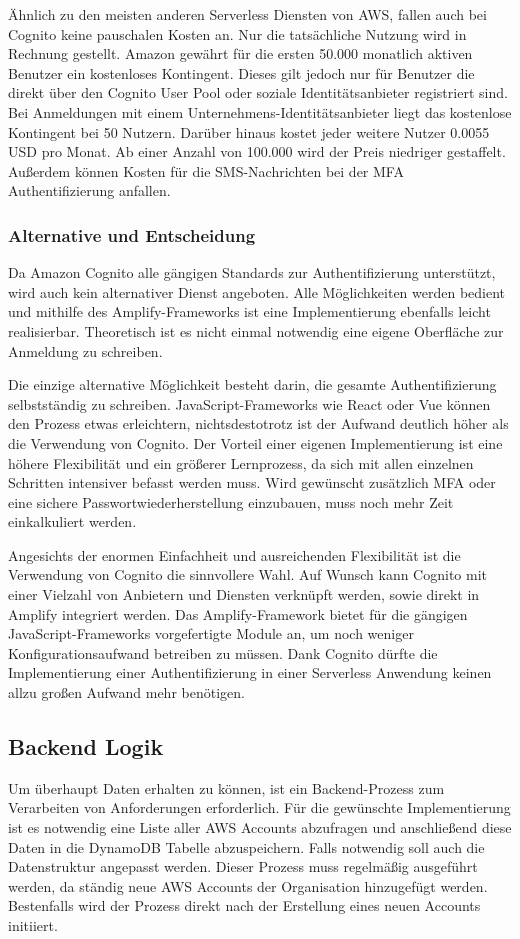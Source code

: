 {Ähnlich zu den meisten anderen Serverless Diensten von AWS, fallen auch bei Cognito keine pauschalen Kosten an.
Nur die tatsächliche Nutzung wird in Rechnung gestellt.
Amazon gewährt für die ersten 50.000 monatlich aktiven Benutzer ein kostenloses Kontingent.
Dieses gilt jedoch nur für Benutzer die direkt über den Cognito User Pool oder soziale Identitätsanbieter registriert sind.
Bei Anmeldungen mit einem Unternehmens-Identitätsanbieter liegt das kostenlose Kontingent bei 50 Nutzern.
Darüber hinaus kostet jeder weitere Nutzer 0.0055 USD pro Monat.
Ab einer Anzahl von 100.000 wird der Preis niedriger gestaffelt.
Außerdem können Kosten für die SMS-Nachrichten bei der MFA Authentifizierung anfallen.\cite{CognitoPreise}


\subsubsection{Alternative und Entscheidung}
\label{CognitoEntscheidung}
Da Amazon Cognito alle gängigen Standards zur Authentifizierung unterstützt, wird auch kein alternativer Dienst angeboten.
Alle Möglichkeiten werden bedient und mithilfe des Amplify-Frameworks ist eine Implementierung ebenfalls leicht realisierbar.
Theoretisch ist es nicht einmal notwendig eine eigene Oberfläche zur Anmeldung zu schreiben.

Die einzige alternative Möglichkeit besteht darin, die gesamte Authentifizierung selbstständig zu schreiben.
JavaScript-Frameworks wie React oder Vue können den Prozess etwas erleichtern, nichtsdestotrotz ist der Aufwand deutlich höher als die Verwendung von Cognito.
Der Vorteil einer eigenen Implementierung ist eine höhere Flexibilität und ein größerer Lernprozess, da sich mit allen einzelnen Schritten intensiver befasst werden muss.
Wird gewünscht zusätzlich MFA oder eine sichere Passwortwiederherstellung einzubauen, muss noch mehr Zeit einkalkuliert werden.

Angesichts der enormen Einfachheit und ausreichenden Flexibilität ist die Verwendung von Cognito die sinnvollere Wahl.
Auf Wunsch kann Cognito mit einer Vielzahl von Anbietern und Diensten verknüpft werden, sowie direkt in Amplify integriert werden.
Das Amplify-Framework bietet für die gängigen JavaScript-Frameworks vorgefertigte Module an, um noch weniger Konfigurationsaufwand betreiben zu müssen.
Dank Cognito dürfte die Implementierung einer Authentifizierung in einer Serverless Anwendung keinen allzu großen Aufwand mehr benötigen.


\subsection{Backend Logik}
Um überhaupt Daten erhalten zu können, ist ein Backend-Prozess zum Verarbeiten von Anforderungen erforderlich.
Für die gewünschte Implementierung ist es notwendig eine Liste aller AWS Accounts abzufragen und anschließend diese Daten in die DynamoDB Tabelle abzuspeichern.
Falls notwendig soll auch die Datenstruktur angepasst werden.
Dieser Prozess muss regelmäßig ausgeführt werden, da ständig neue AWS Accounts der Organisation hinzugefügt werden.
Bestenfalls wird der Prozess direkt nach der Erstellung eines neuen Accounts initiiert.

}
